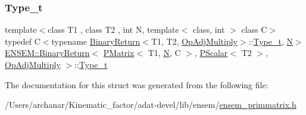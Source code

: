 \subsubsection{\texorpdfstring{Type\_t}{Type\_t}\hspace{0.1cm}{\footnotesize\ttfamily [3/3]}}
{\footnotesize\ttfamily template$<$class T1 , class T2 , int N, template$<$ class, int $>$ class C$>$ \\
typedef C$<$typename \mbox{\hyperlink{structENSEM_1_1BinaryReturn}{Binary\+Return}}$<$T1, T2, \mbox{\hyperlink{structENSEM_1_1OpAdjMultiply}{Op\+Adj\+Multiply}}$>$\+::\mbox{\hyperlink{structENSEM_1_1BinaryReturn_3_01PMatrix_3_01T1_00_01N_00_01C_01_4_00_01PScalar_3_01T2_01_4_00_01OpAdjMultiply_01_4_adce401cd4364b40ece4bc82a1d0cea68}{Type\+\_\+t}}, \mbox{\hyperlink{adat__devel_2lib_2hadron_2operator__name__util_8cc_a7722c8ecbb62d99aee7ce68b1752f337}{N}}$>$ \mbox{\hyperlink{structENSEM_1_1BinaryReturn}{E\+N\+S\+E\+M\+::\+Binary\+Return}}$<$ \mbox{\hyperlink{classENSEM_1_1PMatrix}{P\+Matrix}}$<$ T1, \mbox{\hyperlink{adat__devel_2lib_2hadron_2operator__name__util_8cc_a7722c8ecbb62d99aee7ce68b1752f337}{N}}, C $>$, \mbox{\hyperlink{classENSEM_1_1PScalar}{P\+Scalar}}$<$ T2 $>$, \mbox{\hyperlink{structENSEM_1_1OpAdjMultiply}{Op\+Adj\+Multiply}} $>$\+::\mbox{\hyperlink{structENSEM_1_1BinaryReturn_3_01PMatrix_3_01T1_00_01N_00_01C_01_4_00_01PScalar_3_01T2_01_4_00_01OpAdjMultiply_01_4_adce401cd4364b40ece4bc82a1d0cea68}{Type\+\_\+t}}}



The documentation for this struct was generated from the following file\+:\begin{DoxyCompactItemize}
\item 
/\+Users/archanar/\+Kinematic\+\_\+factor/adat-\/devel/lib/ensem/\mbox{\hyperlink{adat-devel_2lib_2ensem_2ensem__primmatrix_8h}{ensem\+\_\+primmatrix.\+h}}\end{DoxyCompactItemize}
